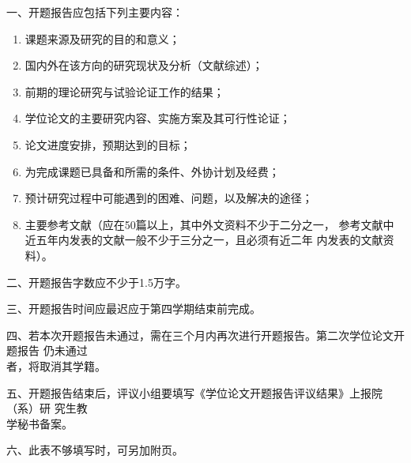 {%
\newpage
\thispagestyle{empty}
\vspace*{14pt}
\begin{center}
  {\hei\sanhao {}}
\end{center}
\vspace*{40pt}
    {\song\renewcommand{}
    \fontsize{10.5pt}{12.6pt}\selectfont
    \noindent 一、开题报告应包括下列主要内容：
    \begin{enumerate}[leftmargin=36pt,itemindent=-2pt,itemsep=0ex,listparindent=21.8pt,partopsep=0pt,parsep=0.5ex,topsep=-0ex]
    \item 课题来源及研究的目的和意义；
    \item 国内外在该方向的研究现状及分析（文献综述）；
    \item 前期的理论研究与试验论证工作的结果；
    \item 学位论文的主要研究内容、实施方案及其可行性论证；
    \item 论文进度安排，预期达到的目标；
    \item 为完成课题已具备和所需的条件、外协计划及经费；
    \item 预计研究过程中可能遇到的困难、问题，以及解决的途径；
    \item 主要参考文献（应在50篇以上，其中外文资料不少于二分之一，
    参考文献中近五年内发表的文献一般不少于三分之一，且必须有近二年
    内发表的文献资料）。
    \end{enumerate}
    \noindent 二、开题报告字数应不少于1.5万字。

    \noindent 三、开题报告时间应最迟应于第四学期结束前完成。

    \noindent 四、若本次开题报告未通过，\hspace{-1pt}需在三个月内再次进行开题报告。\hspace{-1pt}第二次学位论文开题报告 %
    仍未通过\\ \hspace*{20.6pt}者，将取消其学籍。 %

    \noindent 五、开题报告结束后，\hfill 评议小组要填写\hfill《\cxuewei 学位论文开题报告评议结果》\hfill 上报院\hfill（系）\hfill 研
    究生教\\\hspace*{20.6pt}学秘书备案。%

    \noindent 六、此表不够填写时，可另加附页。
    }
    \clearpage
    \ifoneortwoside
    \else
    \fi
}%
\fi

